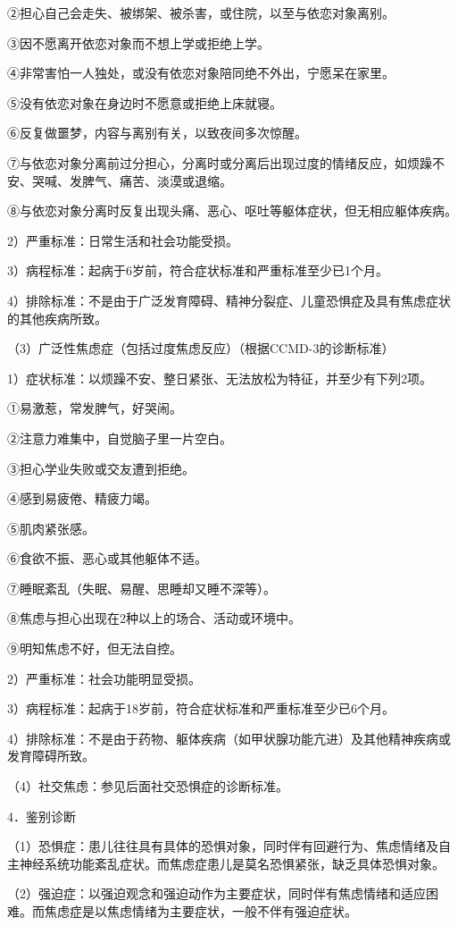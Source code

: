 ②担心自己会走失、被绑架、被杀害，或住院，以至与依恋对象离别。

③因不愿离开依恋对象而不想上学或拒绝上学。

④非常害怕一人独处，或没有依恋对象陪同绝不外出，宁愿呆在家里。

⑤没有依恋对象在身边时不愿意或拒绝上床就寝。

⑥反复做噩梦，内容与离别有关，以致夜间多次惊醒。

⑦与依恋对象分离前过分担心，分离时或分离后出现过度的情绪反应，如烦躁不安、哭喊、发脾气、痛苦、淡漠或退缩。

⑧与依恋对象分离时反复出现头痛、恶心、呕吐等躯体症状，但无相应躯体疾病。

2）严重标准：日常生活和社会功能受损。

3）病程标准：起病于6岁前，符合症状标准和严重标准至少已1个月。

4）排除标准：不是由于广泛发育障碍、精神分裂症、儿童恐惧症及具有焦虑症状的其他疾病所致。

（3）广泛性焦虑症（包括过度焦虑反应）（根据CCMD-3的诊断标准）

1）症状标准：以烦躁不安、整日紧张、无法放松为特征，并至少有下列2项。

①易激惹，常发脾气，好哭闹。

②注意力难集中，自觉脑子里一片空白。

③担心学业失败或交友遭到拒绝。

④感到易疲倦、精疲力竭。

⑤肌肉紧张感。

⑥食欲不振、恶心或其他躯体不适。

⑦睡眠紊乱（失眠、易醒、思睡却又睡不深等）。

⑧焦虑与担心出现在2种以上的场合、活动或环境中。

⑨明知焦虑不好，但无法自控。

2）严重标准：社会功能明显受损。

3）病程标准：起病于18岁前，符合症状标准和严重标准至少已6个月。

4）排除标准：不是由于药物、躯体疾病（如甲状腺功能亢进）及其他精神疾病或发育障碍所致。

（4）社交焦虑：参见后面社交恐惧症的诊断标准。

4．鉴别诊断

（1）恐惧症：患儿往往具有具体的恐惧对象，同时伴有回避行为、焦虑情绪及自主神经系统功能紊乱症状。而焦虑症患儿是莫名恐惧紧张，缺乏具体恐惧对象。

（2）强迫症：以强迫观念和强迫动作为主要症状，同时伴有焦虑情绪和适应困难。而焦虑症是以焦虑情绪为主要症状，一般不伴有强迫症状。

